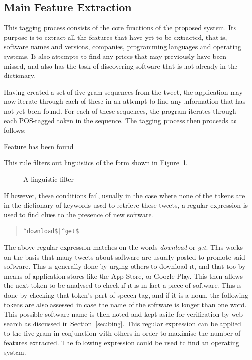 \subsection{Main Feature Extraction}
This tagging process consists of the core functions of the proposed system. Its purpose is to extract all the features that have yet to be extracted, that is, software names and versions, companies, programming languages and operating systems. It also attempts to find any prices that may previously have been missed, and also has the task of discovering software that is not already in the dictionary.

Having created a set of five-gram sequences from the tweet, the application may now iterate through each of these in an attempt to find any information that has not yet been found. For each of these sequences, the program iterates through each POS-tagged token in the sequence. The tagging process then proceeds as follows: 
\newline
\begin{algorithmic}
            \State Feature has been found
        \EndIf
    \EndIf
\EndIf
\end{algorithmic}

This rule filters out linguistics of the form shown in Figure~\ref{fig:rule1}.
\begin{figure}[h!]
 \centering
  
  \caption{A linguistic filter
    \label{fig:rule1}}
\end{figure}
If however, these conditions fail, usually in the case where none of the tokens are in the dictionary of keywords used to retrieve these tweets, a regular expression is used to find clues to the presence of new software.

\begin{quote}
\verb~^download$|^get$~
\end{quote}

The above regular expression matches on the words \emph{download} or \emph{get}. This works on the basis that many tweets about software are usually posted to promote said software. This is generally done by urging others to download it, and that too by means of application stores like the App Store, or Google Play. This then allows the next token to be analysed to check if it is in fact a piece of software. This is done by checking that token's part of speech tag, and if it is a noun, the following tokens are also assessed in case the name of the software is longer than one word. This possible software name is then noted and kept aside for verification by web search as discussed in Section~\ref{sec:bing}. This regular expression can be applied to the five-gram in conjunction with others in order to maximise the number of features extracted. The following expression could be used to find an operating system.

